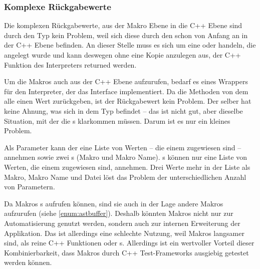     \subsubsection{Komplexe Rückgabewerte}
    \label{sssec:Komplexe Rückgabewerte}
      Die komplexen Rückgabewerte, aus der Makro Ebene in die C++ Ebene sind durch den  Typ kein Problem, weil sich diese durch den  schon von Anfang an in der C++ Ebene befinden. An dieser Stelle muss es sich um eine  oder  handeln, die angelegt wurde und kann deswegen ohne eine Kopie anzulegen aus, der C++ Funktion des Interpreters returned werden.

      Um die Makros auch aus der C++ Ebene aufzurufen, bedarf es eines Wrappers für den Interpreter, der das  Interface implementiert. Da die  Methoden von dem  alle einen  Wert zurückgeben, ist der Rückgabewert kein Problem. Der  selber hat keine Ahnung, was sich in dem  Typ befindet -- das ist nicht gut, aber dieselbe Situation, mit der die s klarkommen müssen. Darum ist es nur ein kleines Problem.

      Als Parameter kann der  eine Liste von  Werten -- die einem  zugewiesen sind -- annehmen sowie zwei s (Makro und Makro Name). s können nur eine Liste von  Werten, die einem  zugewiesen sind, annehmen. Drei  Werte mehr in der Liste als Makro, Makro Name und Datei löst das Problem der unterschiedlichen Anzahl von Parametern.

      Da Makros s aufrufen können, sind sie auch in der Lage andere Makros aufzurufen (siehe \ref{enum:astbuffer}). Deshalb könnten Makros nicht nur zur Automatisierung genutzt werden, sondern auch zur internen Erweiterung der Applikation. Das ist allerdings eine schlechte Nutzung, weil Makros langsamer sind, als reine C++ Funktionen oder s. Allerdings ist ein wertvoller Vorteil dieser Kombinierbarkeit, dass Makros durch C++ Test-Frameworks ausgiebig getestet werden können.


